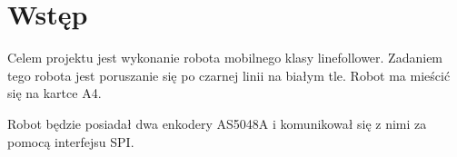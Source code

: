 \documentclass[12pt,a4paper]{article}
\begin{document}
\maketitle %
\tableofcontents %
\newpage %


\section{Wstęp}

Celem projektu jest wykonanie robota mobilnego klasy linefollower. Zadaniem tego robota jest poruszanie się po czarnej linii na białym tle. Robot ma mieścić się na kartce A4. 

Robot będzie posiadał dwa enkodery AS5048A i komunikował się z nimi za pomocą interfejsu SPI.
\end{document}
